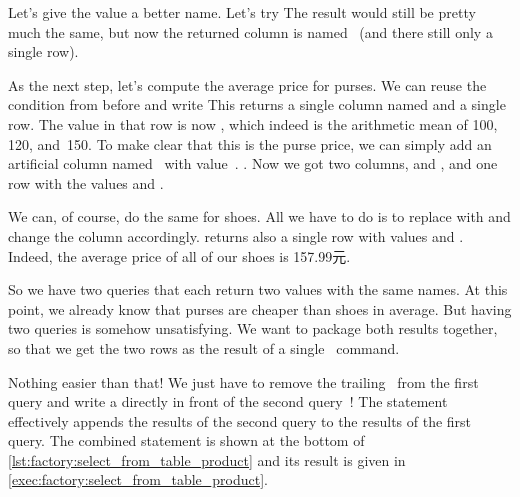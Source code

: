 Let's give the value a better name.
Let's try 
The result would still be pretty much the same, but now the returned column is named~ (and there still only a single row).%
%
\begin{sloppypar}%
As the next step, let's compute the average price for purses.
We can reuse the condition  from before and write 
This returns a single column named  and a single row.
The value in that row is now , which indeed is the arithmetic mean of 100, 120, and~150.
To make clear that this is the purse price, we can simply add an artificial column named~ with value~.
.
Now we got two columns,  and , and one row with the values  and .%
\end{sloppypar}%
%
\begin{sloppypar}%
We can, of course, do the same for shoes.
All we have to do is to replace  with  and change the  column accordingly.
 returns also a single row with values  and .
Indeed, the average price of all of our shoes is 157.99元.%
\end{sloppypar}%
%
So we have two queries that each return two values with the same names.
At this point, we already know that purses are cheaper than shoes in average.
But having two queries is somehow unsatisfying.
We want to package both results together, so that we get the two rows as the result of a single \sql\ command.

Nothing easier than that!
We just have to remove the trailing~\sqlil{;} from the first query and write a  directly in front of the second query~\cite{PGDG:PD:CQUIE}!
The  statement effectively appends the results of the second query to the results of the first query.
The combined statement is shown at the bottom of \cref{lst:factory:select_from_table_product} and its result is given in \cref{exec:factory:select_from_table_product}.

